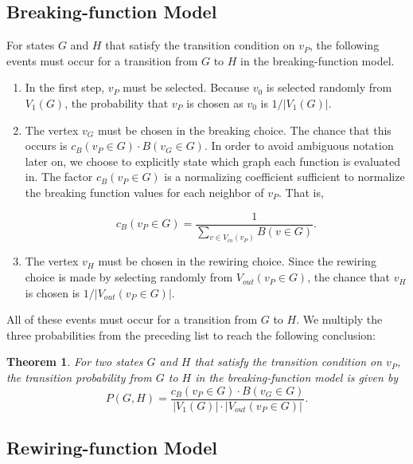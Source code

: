 \documentclass[a4paper,10pt]{article}
\newtheorem{theorem}{Theorem}
\begin{document}
\subsection{Breaking-function Model}

For states $G$ and $H$ that satisfy the transition condition on $v_P$, the following events must occur for a transition from $G$ to $H$ in the breaking-function model.

\begin{enumerate}
 \item In the first step, $v_P$ must be selected. Because $v_0$ is selected randomly from $V_1(G)$, the probability that $v_P$ is chosen as $v_0$ is $1 / |V_1(G)|$.
 \item The vertex $v_G$ must be chosen in the breaking choice. The chance that this occurs is $c_B(v_P \in G) \cdot B(v_G \in G)$. In order to avoid ambiguous notation later on, we choose to explicitly state which graph each function is evaluated in. The factor $c_B(v_P \in G)$ is a normalizing coefficient sufficient to normalize the breaking function values for each neighbor of $v_P$. That is,

   \begin{equation}
    c_B(v_P \in G) = \frac{1}{\sum \limits_{v \in V_{in}(v_P)} B(v \in G)}.
   \end{equation}


 \item The vertex $v_H$ must be chosen in the rewiring choice. Since the rewiring choice is made by selecting randomly from $V_{out}(v_P \in G)$, the chance that $v_H$ is chosen is $1 / |V_{out}(v_P \in G)|$.  
\end{enumerate}

All of these events must occur for a transition from $G$ to $H$. We multiply the three probabilities from the preceding list to reach the following conclusion:

\begin{theorem}
\label{thm:breaking-trans-prob}
For two states $G$ and $H$ that satisfy the transition condition on $v_P$, the transition probability from $G$ to $H$ in the breaking-function model is given by
\begin{equation}
\label{eqn:breaking-trans-prob}
P(G, H) = \frac{c_B(v_P \in G) \cdot B(v_G \in G)}{|V_1(G)| \cdot |V_{out}(v_P \in G)|}.
\end{equation}
\end{theorem}

\subsection{Rewiring-function Model}
\end{document}
